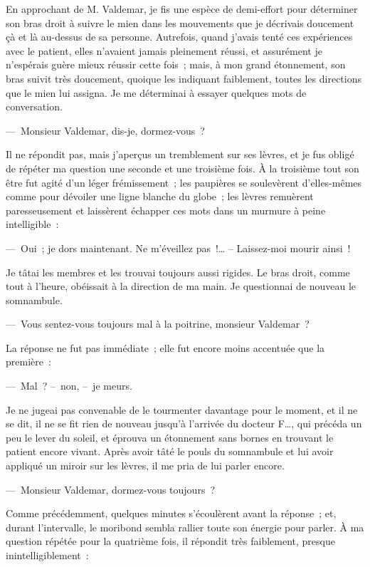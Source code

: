 \documentclass[french,twoside]{book} %
\begin{document}
En approchant de M. Valdemar, je fis une espèce de demi-effort pour déterminer son bras droit à suivre le mien dans les mouvements que je décrivais doucement çà et là au-dessus de sa personne. Autrefois, quand j’avais tenté ces expériences avec le patient, elles n’avaient jamais pleinement réussi, et assurément je n’espérais guère mieux réussir cette fois ; mais, à mon grand étonnement, son bras suivit très doucement, quoique les indiquant faiblement, toutes les directions que le mien lui assigna. Je me déterminai à essayer quelques mots de conversation.\par
— Monsieur Valdemar, dis-je, dormez-vous ?\par
Il ne répondit pas, mais j’aperçus un tremblement sur ses lèvres, et je fus obligé de répéter ma question une seconde et une troisième fois. À la troisième tout son être fut agité d’un léger frémissement ; les paupières se soulevèrent d’elles-mêmes comme pour dévoiler une ligne blanche du globe ; les lèvres remuèrent paresseusement et laissèrent échapper ces mots dans un murmure à peine intelligible :\par
— Oui ; je dors maintenant. Ne m’éveillez pas !… – Laissez-moi mourir ainsi !\par
Je tâtai les membres et les trouvai toujours aussi rigides. Le bras droit, comme tout à l’heure, obéissait à la direction de ma main. Je questionnai de nouveau le somnambule.\par
— Vous sentez-vous toujours mal à la poitrine, monsieur Valdemar ?\par
La réponse ne fut pas immédiate ; elle fut encore moins accentuée que la première :\par
— Mal ? – non, – je meurs.\par
Je ne jugeai pas convenable de le tourmenter davantage pour le moment, et il ne se dit, il ne se fit rien de nouveau jusqu’à l’arrivée du docteur F…, qui précéda un peu le lever du soleil, et éprouva un étonnement sans bornes en trouvant le patient encore vivant. Après avoir tâté le pouls du somnambule et lui avoir appliqué un miroir sur les lèvres, il me pria de lui parler encore.\par
— Monsieur Valdemar, dormez-vous toujours ?\par
Comme précédemment, quelques minutes s’écoulèrent avant la réponse ; et, durant l’intervalle, le moribond sembla rallier toute son énergie pour parler. À ma question répétée pour la quatrième fois, il répondit très faiblement, presque inintelligiblement :\par
\end{document}
